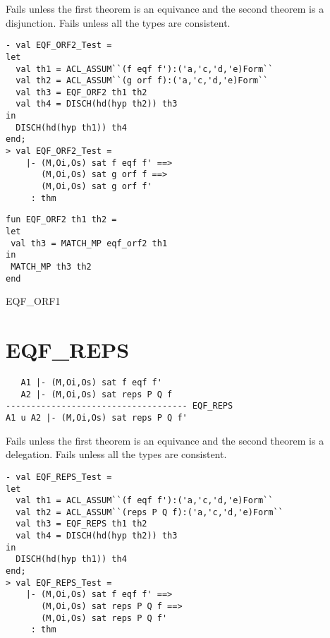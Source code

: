 \FAILURE
Fails unless the first theorem is an equivance and the second theorem
is a disjunction. Fails unless all the types are consistent.

\EXAMPLE
\begin{holboxed}
\begin{verbatim}
- val EQF_ORF2_Test =
let
  val th1 = ACL_ASSUM``(f eqf f'):('a,'c,'d,'e)Form``
  val th2 = ACL_ASSUM``(g orf f):('a,'c,'d,'e)Form``
  val th3 = EQF_ORF2 th1 th2
  val th4 = DISCH(hd(hyp th2)) th3
in
  DISCH(hd(hyp th1)) th4
end;
> val EQF_ORF2_Test =
    |- (M,Oi,Os) sat f eqf f' ==>
       (M,Oi,Os) sat g orf f ==>
       (M,Oi,Os) sat g orf f'
     : thm
\end{verbatim}
\end{holboxed}

\IMPLEMENTATION
\begin{holboxed}
\begin{verbatim}
fun EQF_ORF2 th1 th2 =
let
 val th3 = MATCH_MP eqf_orf2 th1
in
 MATCH_MP th3 th2
end
\end{verbatim}
\end{holboxed}

\SEEALSO
EQF\_ORF1

\ENDDOC

\section{EQF\_REPS}



\egroup

\DESCRIBE
\begin{verbatim}
   A1 |- (M,Oi,Os) sat f eqf f'
   A2 |- (M,Oi,Os) sat reps P Q f
------------------------------------ EQF_REPS
A1 u A2 |- (M,Oi,Os) sat reps P Q f'
\end{verbatim}
\FAILURE
Fails unless the first theorem is an equivance and the second theorem
is a delegation. Fails unless all the types are consistent.

\EXAMPLE
\begin{holboxed}
\begin{verbatim}
- val EQF_REPS_Test =
let
  val th1 = ACL_ASSUM``(f eqf f'):('a,'c,'d,'e)Form``
  val th2 = ACL_ASSUM``(reps P Q f):('a,'c,'d,'e)Form``
  val th3 = EQF_REPS th1 th2
  val th4 = DISCH(hd(hyp th2)) th3
in
  DISCH(hd(hyp th1)) th4
end;
> val EQF_REPS_Test =
    |- (M,Oi,Os) sat f eqf f' ==>
       (M,Oi,Os) sat reps P Q f ==>
       (M,Oi,Os) sat reps P Q f'
     : thm
\end{verbatim}
\end{holboxed}

